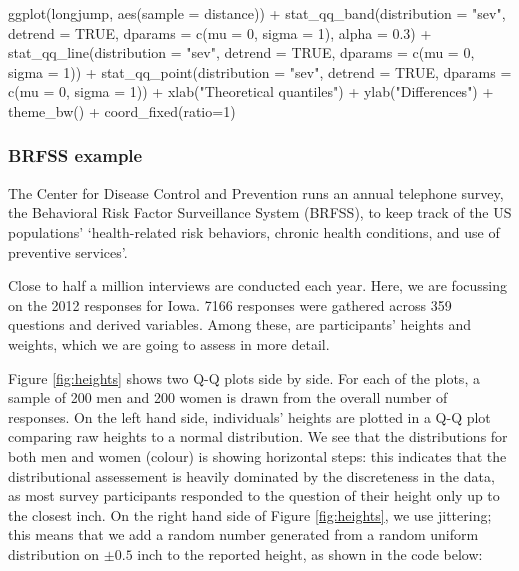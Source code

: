 \begin{Schunk}
\begin{Sinput}
ggplot(longjump, aes(sample = distance)) +
  stat_qq_band(distribution = "sev", detrend = TRUE, dparams = c(mu = 0, sigma = 1),  
               alpha = 0.3) +
  stat_qq_line(distribution = "sev", detrend = TRUE, dparams = c(mu = 0, sigma = 1)) +
  stat_qq_point(distribution = "sev", detrend = TRUE, dparams = c(mu = 0, sigma = 1)) +
  xlab("Theoretical quantiles") +
  ylab("Differences") +
  theme_bw() +
  coord_fixed(ratio=1)
\end{Sinput}
\end{Schunk}

\subsubsection{BRFSS example}\label{brfss-example}

\label{sec:brfss}

The Center for Disease Control and Prevention runs an annual telephone
survey, the Behavioral Risk Factor Surveillance System (BRFSS), to keep
track of the US populations' `health-related risk behaviors, chronic
health conditions, and use of preventive services'.

Close to half a million interviews are conducted each year. Here, we are
focussing on the 2012 responses for Iowa. 7166 responses were gathered
across 359 questions and derived variables. Among these, are
participants' heights and weights, which we are going to assess in more
detail.

Figure \ref{fig:heights} shows two Q-Q plots side by side. For each of
the plots, a sample of 200 men and 200 women is drawn from the overall
number of responses. On the left hand side, individuals' heights are
plotted in a Q-Q plot comparing raw heights to a normal distribution. We
see that the distributions for both men and women (colour) is showing
horizontal steps: this indicates that the distributional assessement is
heavily dominated by the discreteness in the data, as most survey
participants responded to the question of their height only up to the
closest inch. On the right hand side of Figure \ref{fig:heights}, we use
jittering; this means that we add a random number generated from a
random uniform distribution on \(\pm 0.5\) inch to the reported height,
as shown in the code below:

